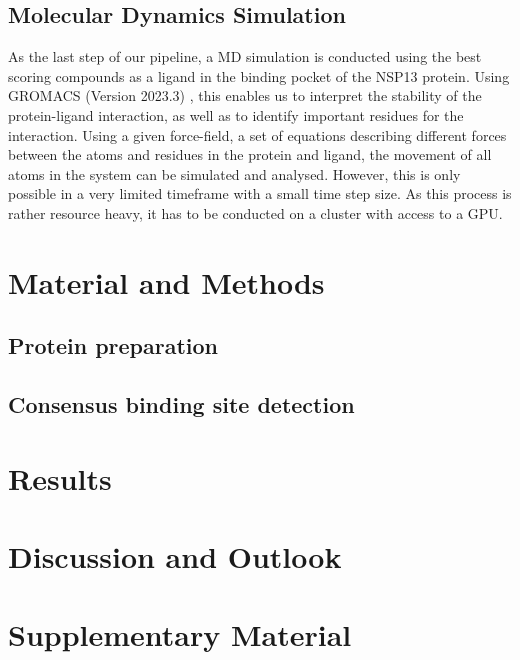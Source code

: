 \documentclass[11pt, letterpaper, titlepage]{article}
\renewcommand{\cite}{\parencite}
\begin{document}
\subsection{Molecular Dynamics Simulation}
As the last step of our pipeline, a MD simulation is conducted using the best scoring compounds as a ligand in the binding pocket of the NSP13 protein. Using GROMACS (Version 2023.3) \cite{package_GROMACS}, this enables us to interpret the stability of the protein-ligand interaction, as well as to identify important residues for the interaction. Using a given force-field, a set of equations describing different forces between the atoms and residues in the protein and ligand, the movement of all atoms in the system can be simulated and analysed. However, this is only possible in a very limited timeframe with a small time step size. As this process is rather resource heavy, it has to be conducted on a cluster with access to a GPU. 

\section{Material and Methods}
\subsection{Protein preparation}
\subsection{Consensus binding site detection}
\section{Results} 

\FloatBarrier

\section{Discussion and Outlook}

\section{Supplementary Material}

\pagebreak
\FloatBarrier

\renewcommand{\bibname}{References}  %
\printbibliography
\end{document}
